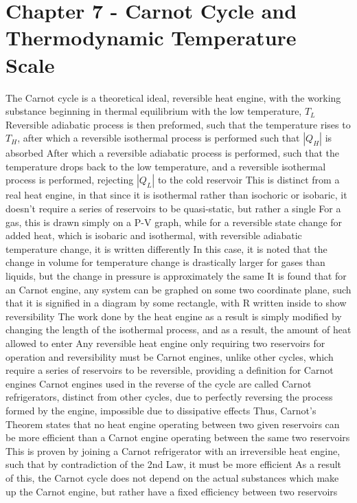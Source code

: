 \documentclass[11 pt, twoside]{article}
\newenvironment{outline*}
{
	\begin{outline}[enumerate]
	}
	{\end{outline}
}
\begin{document}
\section{Chapter 7 - Carnot Cycle and Thermodynamic Temperature Scale}
\begin{outline*}
\1 The Carnot cycle is a theoretical ideal, reversible heat engine, with the working substance beginning in thermal equilibrium with the low temperature, $T_L$
\2 Reversible adiabatic process is then preformed, such that the temperature rises to $T_H$, after which a reversible isothermal process is performed such that $|Q_H|$ is absorbed
\2 After which a reversible adiabatic process is performed, such that the temperature drops back to the low temperature, and a reversible isothermal process is performed, rejecting $|Q_L|$ to the cold reservoir
\2 This is distinct from a real heat engine, in that since it is isothermal rather than isochoric or isobaric, it doesn't require a series of reservoirs to be quasi-static, but rather a single
\1 For a gas, this is drawn simply on a P-V graph, while for a reversible state change for added heat, which is isobaric and isothermal, with reversible adiabatic temperature change, it is written differently
\2 In this case, it is noted that the change in volume for temperature change is drastically larger for gases than liquids, but the change in pressure is approximately the same
\3 It is found that for an Carnot engine, any system can be graphed on some two coordinate plane, such that it is signified in a diagram by some rectangle, with R written inside to show reversibility
\2 The work done by the heat engine as a result is simply modified by changing the length of the isothermal process, and as a result, the amount of heat allowed to enter
\1 Any reversible heat engine only requiring two reservoirs for operation and reversibility must be Carnot engines, unlike other cycles, which require a series of reservoirs to be reversible, providing a definition for Carnot engines
\2 Carnot engines used in the reverse of the cycle are called Carnot refrigerators, distinct from other cycles, due to perfectly reversing the process formed by the engine, impossible due to dissipative effects
\2 Thus, Carnot's Theorem states that no heat engine operating between two given reservoirs can be more efficient than a Carnot engine operating between the same two reservoirs
\3 This is proven by joining a Carnot refrigerator with an irreversible heat engine, such that by contradiction of the 2nd Law, it must be more efficient
\3 As a result of this, the Carnot cycle does not depend on the actual substances which make up the Carnot engine, but rather have a fixed efficiency between two reservoirs

\end{outline*}
\end{document}
